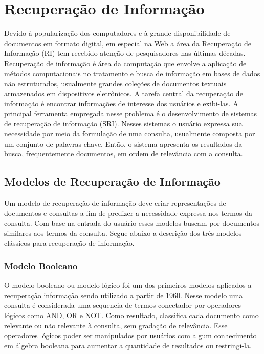 \section{Recuperação de Informação}


Devido à popularização dos computadores e à grande disponibilidade de documentos em formato digital, em especial na Web a área da Recuperação de Informação (RI) tem recebido atenção de pesquisadores nas últimas décadas.
% 
Recuperação de informação é área da computação que envolve a aplicação de métodos computacionais no tratamento e busca de informação em bases de dados não estruturados, usualmente grandes coleções de documentos textuais armazenados em dispositivos eletrônicos.
A tarefa central da recuperação de informação é encontrar informações de interesse dos usuários e exibi-las. A principal ferramenta empregada nesse problema é o desenvolvimento de sistemas de recuperação de informação (SRI). Nesses sistemas o usuário expressa sua necessidade por meio da formulação de uma consulta, usualmente composta por um conjunto de palavras-chave. Então, o sistema apresenta os resultados da busca, frequentemente documentos, em ordem de relevância com a consulta.



\subsection{Modelos de Recuperação de Informação}

Um modelo de recuperação de informação deve criar representações de documentos e consultas a fim de predizer a necessidade expressa nos termos da consulta. Com base na entrada do usuário esses modelos buscam por documentos similares aos termos da consulta. Segue abaixo a descrição dos três modelos clássicos para recuperação de informação.

\subsubsection{Modelo Booleano}

O modelo booleano ou modelo lógico foi um dos primeiros modelos aplicados a recuperação informação sendo utilizado a partir de 1960. Nesse modelo uma consulta é considerada uma sequencia de termos conectador por operadores lógicos como AND, OR e NOT. Como resultado, classifica cada documento como relevante ou não relevante à consulta, sem gradação de relevância. Esse operadores lógicos poder ser manipulados por usuários com algum conhecimento em álgebra booleana para aumentar a quantidade de resultados ou restringi-la.

